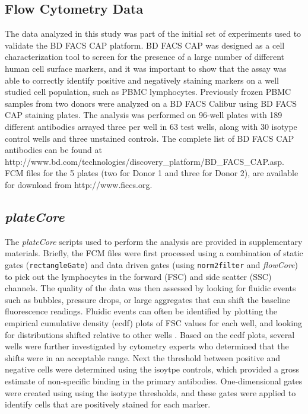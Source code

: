 \documentclass[12pt]{article}
\newcommand{\Robject}[1]{{\texttt{#1}}}
\newcommand{\Rpackage}[1]{{\textit{#1}}}
\begin{document}
\subsection*{Flow Cytometry Data}

The data analyzed in this study was part of the initial set of experiments
used to validate the BD FACS CAP platform. BD FACS CAP was designed as a cell
characterization tool to screen for the presence of a large number of different
human cell surface markers, and it was important to show that the assay was
able to correctly identify positive and negatively staining markers on a well
studied cell population, such as PBMC lymphocytes. Previously
frozen PBMC samples from two donors were analyzed on a BD FACS Calibur using BD
FACS CAP staining plates. The analysis was performed on 96-well plates with 189
different antibodies arrayed three per well in 63 test wells, along with 30
isotype control wells and three unstained controls. The complete list of BD
FACS CAP antibodies can be found at
http://www.bd.com/technologies/discovery\_platform/BD\_FACS\_CAP.asp. FCM files
for the 5 plates (two for Donor 1 and three for Donor 2), are available for
download from http://www.ficcs.org.

\subsection*{\Rpackage{plateCore}}

The \Rpackage{plateCore}
scripts used to perform the analysis are provided in supplementary materials.
Briefly, the FCM files were first processed using a combination of static
gates (\Robject{rectangleGate}) and data driven gates (using
\Robject{norm2filter} and \Rpackage{flowCore}) to pick out the lymphocytes in
the forward (FSC) and side scatter (SSC) channels.  The
quality of the data was then assessed by looking for fluidic events such as
bubbles, pressure drops, or large aggregates that can shift the baseline
fluorescence readings. Fluidic events can often be identified by plotting the
empirical cumulative density (ecdf) plots of FSC values for each well, and
looking for distributions shifted relative to other wells \citep{lemeur2007}.
Based on the ecdf plots, several wells were further investigated by cytometry
experts who determined that the shifts were in an acceptable range. Next the
threshold between positive and negative cells were determined using the isoytpe
controls, which provided a gross estimate of non-specific binding in the
primary antibodies. One-dimensional gates were created using using the isotype
thresholds, and these gates were applied to identify cells that are positively
stained for each marker.
\end{document}
